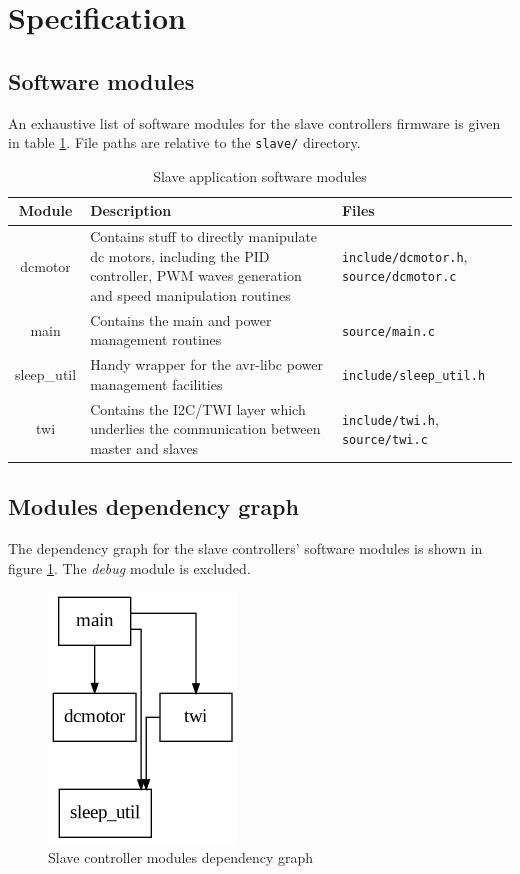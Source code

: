 \documentclass[binding=0.6cm,Lau]{sapthesis}
\begin{document}
\section{Specification}

\subsection{Software modules}
An exhaustive list of software modules for the slave controllers firmware is
given in table \ref{tab:slave-spec-modules}. File paths are relative to the
\texttt{slave/} directory.

\begin{table}[bh]
  \begin{tabularx}{\textwidth}{c X X}
    \toprule
    Module & Description & Files \\
    \midrule
    dcmotor &
      Contains stuff to directly manipulate dc motors, including the PID controller, PWM waves generation and speed manipulation routines &
      \texttt{include/dcmotor.h}, \texttt{source/dcmotor.c} \\
    main &
      Contains the main and power management routines &
      \texttt{source/main.c} \\
    sleep\_util &
      Handy wrapper for the avr-libc power management facilities &
      \texttt{include/sleep\_util.h} \\
    twi &
      Contains the I2C/TWI layer which underlies the communication between master and slaves &
      \texttt{include/twi.h}, \texttt{source/twi.c} \\
    \bottomrule
  \end{tabularx}
  \caption{Slave application software modules}
  \label{tab:slave-spec-modules}
\end{table}


\subsection{Modules dependency graph}
The dependency graph for the slave controllers' software modules is shown in
figure \ref{img:slave-deps-graph}. The \emph{debug} module is excluded.
\begin{figure}[hbp]
\begin{centering}
  \includegraphics[scale=0.5]{img/slave-deps}
  \caption{Slave controller modules dependency graph}
  \label{img:slave-deps-graph}
\end{centering}
\end{figure}
\end{document}
